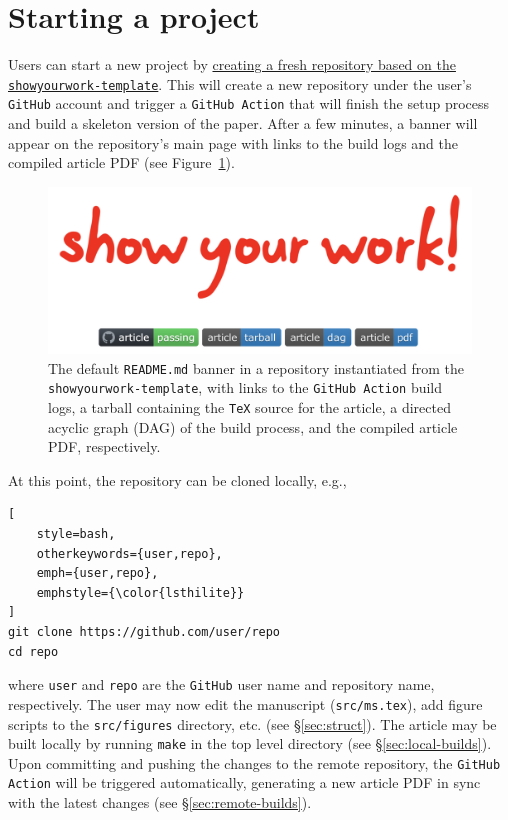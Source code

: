 \documentclass[twocolumn]{aastex631}
\begin{document}
\section{Starting a project}
\label{sec:start}
%
Users can start a new project by \href{https://github.com/rodluger/showyourwork-template/generate}{creating a fresh repository based on the \texttt{showyourwork-template}}.
This will create a new repository under the user's \texttt{GitHub} account and trigger a \texttt{GitHub Action} that will finish the setup process and build a skeleton version of the paper.
After a few minutes, a banner will appear on the repository's main page with links to the build logs and the compiled article PDF (see Figure~\ref{fig:banner}).
%
\begin{figure}[th!]
    \begin{centering}
        \includegraphics[width=\linewidth]{static/banner.png}
        \caption{
            The default \texttt{README.md} banner in a repository instantiated from the \texttt{showyourwork-template}, with links to the \texttt{GitHub Action} build logs, a tarball containing the \texttt{TeX} source for the article, a directed acyclic graph (DAG) of the build process, and the compiled article PDF, respectively.
        }
        \label{fig:banner}
    \end{centering}
\end{figure}
%
At this point, the repository can be cloned locally, e.g.,
%
\begin{lstlisting}[
    style=bash,
    otherkeywords={user,repo},
    emph={user,repo},
    emphstyle={\color{lsthilite}}
]
git clone https://github.com/user/repo
cd repo
\end{lstlisting}
%
where {\color{lsthilite}\texttt{user}} and {\color{lsthilite}\texttt{repo}} are the \texttt{GitHub} user name and repository name, respectively.
The user may now edit the manuscript (\texttt{src/ms.tex}), add figure scripts to the \texttt{src/figures} directory, etc. (see \S\ref{sec:struct}).
The article may be built locally by running \texttt{make} in the top level directory (see \S\ref{sec:local-builds}).
Upon committing and pushing the changes to the remote repository, the \texttt{GitHub Action} will be triggered automatically, generating a new article PDF in sync with the latest changes (see \S\ref{sec:remote-builds}).
\end{document}
